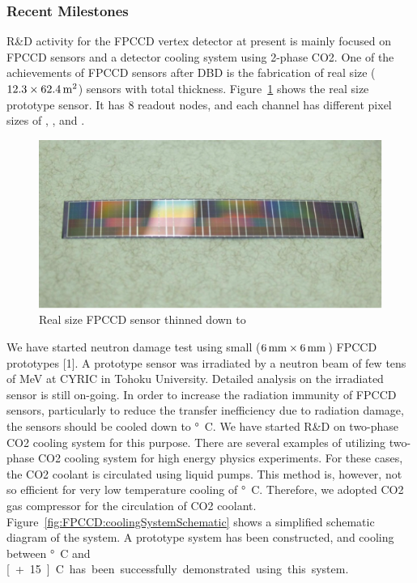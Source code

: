 \subsubsection{Recent Milestones}
R\&D activity for the FPCCD vertex detector at present is mainly focused on FPCCD sensors and a detector cooling system using 2-phase CO2.  
One of the achievements of FPCCD sensors after DBD is the fabrication of real size ($12.3 \times \unit[62.4]{\mathrm{m}^2}$) sensors with \unit[50]{\micron} total thickness. Figure~\ref{fig:FPCCD:realSizeSensor} shows the real size prototype sensor. It has 8 readout nodes, and each channel has different pixel sizes of \unit[12]{\micron}, \unit[8]{\micron}, and \unit[6]{\micron}.
\begin{figure}
    \includegraphics[width=\textwidth]{VertexDetector/FPCCD/realSizeFPCCDSensor.png}
    \caption{Real size FPCCD sensor thinned down to \unit[50]{\micron}}
    \label{fig:FPCCD:realSizeSensor}
\end{figure}
We have started neutron damage test using small ($\unit[6]{mm}\times\unit[6]{mm}$) FPCCD prototypes [1]. A prototype sensor was irradiated by a neutron beam of few tens of MeV at CYRIC in Tohoku University. Detailed analysis on the irradiated sensor is still on-going. 
In order to increase the radiation immunity of FPCCD sensors, particularly to reduce the transfer inefficiency due to radiation damage, the sensors should be cooled down to \unit[-40]{\degree C}. We have started R\&D on two-phase CO2 cooling system for this purpose. There are several examples of utilizing two-phase CO2 cooling system for high energy physics experiments. For these cases, the CO2 coolant is circulated using liquid pumps. This method is, however, not so efficient for very low temperature cooling of \unit[-40]{\degree C}. Therefore, we adopted CO2 gas compressor for the circulation of CO2 coolant. Figure~\ref{fig:FPCCD:coolingSystemSchematic} shows a simplified schematic diagram of the system. A prototype system has been constructed, and cooling between \unit[-40]{\degree C} and \unit[+15]{\degree C} has been successfully demonstrated using this system.
